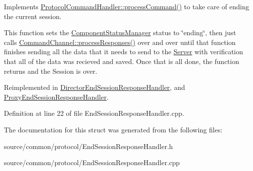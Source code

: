 Implements \hyperlink{struct_picto_1_1_protocol_command_handler_aeeaa16fe40f10fd55996d74e16e29cad}{Protocol\-Command\-Handler\-::process\-Command()} to take care of ending the current session. 

This function sets the \hyperlink{class_component_status_manager}{Component\-Status\-Manager} status to \char`\"{}ending\char`\"{}, then just calls \hyperlink{class_picto_1_1_command_channel_aafe619791fb542563544ecf50628238b}{Command\-Channel\-::process\-Responses()} over and over until that function finishes sending all the data that it needs to send to the \hyperlink{class_server}{Server} with verification that all of the data was recieved and saved. Once that is all done, the function returns and the Session is over. 

Reimplemented in \hyperlink{struct_director_end_session_response_handler_a2686e1427340a7d44651e4eee09812a9}{Director\-End\-Session\-Response\-Handler}, and \hyperlink{struct_proxy_end_session_response_handler_a3a3d2ba7dd4265d4722fcd6066002fcd}{Proxy\-End\-Session\-Response\-Handler}.



Definition at line 22 of file End\-Session\-Response\-Handler.\-cpp.



The documentation for this struct was generated from the following files\-:\begin{DoxyCompactItemize}
\item 
source/common/protocol/End\-Session\-Response\-Handler.\-h\item 
source/common/protocol/End\-Session\-Response\-Handler.\-cpp\end{DoxyCompactItemize}
